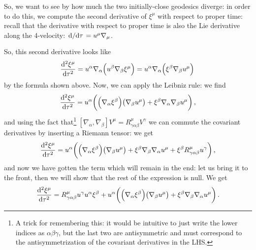 \documentclass[main.tex]{subfiles}
\begin{document}
So, we want to see by how much the two initially-close geodesics diverge: in order to do this, we compute the second derivative of \(\xi^{\mu }\) with respect to proper time: recall that the derivative with respect to proper time is also the Lie derivative along the 4-velocity: \(\dv*{}{\tau } = u^{\mu } \nabla_{\mu }\). 

So, this second derivative looks like 
%
\begin{align}
  \dv[2]{\xi^{ \mu } }{\tau } = u^{\alpha } \nabla_{\alpha } \qty(u^{\beta } \nabla_{\beta } \xi^{\mu })
  = u^{\alpha } \nabla_{\alpha } \qty( \xi^{\beta }\nabla_{\beta } u^{\mu } )
\,
\end{align}
%
by the formula shown above. Now, we can apply the Leibniz rule: we find 
%
\begin{align}
  \dv[2]{\xi^{\mu }}{\tau } = u^{\alpha } \qty( \qty(\nabla_{\alpha } \xi^{\beta }) \qty(\nabla_{\beta } u^{\mu })  
  + \xi^{\beta } \nabla_{\alpha } \nabla_{\beta } u^{\mu } )
\,,
\end{align}
%
and using the fact that\footnote{A trick for remembering this: it would be intuitive to just write the lower indices as \(\alpha \beta \gamma \), but the last two are antisymmetric and must correspond to the antisymmetrization of the covariant derivatives in the LHS.} \([\nabla_{\alpha }, \nabla_{\beta }] V^{\mu } = R^{\mu }_{ \gamma \alpha \beta  } V^{\gamma }\) we can commute the covariant derivatives by inserting a Riemann tensor: we get 
%
\begin{align}
  \dv[2]{\xi^{\mu }}{\tau } = u^{\alpha } \qty( \qty(\nabla_{\alpha } \xi^{\beta }) \qty(\nabla_{\beta } u^{\mu })  
  + \xi^{\beta } \nabla_{\beta }\nabla_{\alpha } u^{\mu }
  + \xi^{\beta } R^{\mu }_{ \gamma \alpha \beta  } u^{\gamma } )
\,,
\end{align}
%
and now we have gotten the term which will remain in the end: let us bring it to the front, then we will show that the rest of the expression is null. We get 
%
\begin{align}
  \dv[2]{\xi^{\mu }}{\tau } =
  R^{\mu }_{ \gamma \alpha \beta  } u^{\gamma } u^{\alpha } \xi^{\beta } 
  + 
  u^{\alpha } \qty( \qty(\nabla_{\alpha } \xi^{\beta }) \qty(\nabla_{\beta } u^{\mu })  
  + \xi^{\beta } \nabla_{\beta }\nabla_{\alpha } u^{\mu } )
\,.
\end{align}
%
\end{document}
